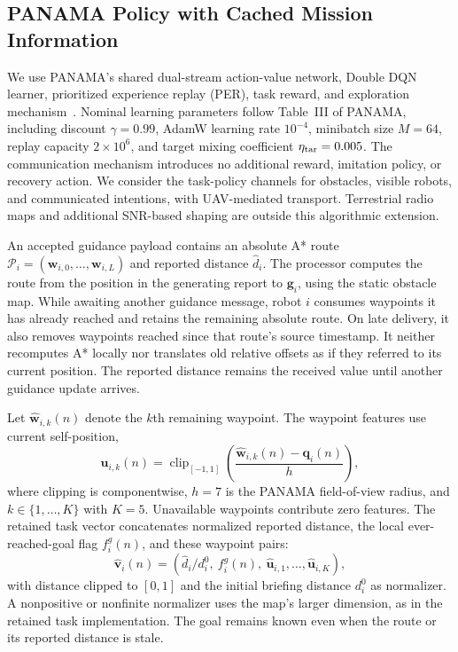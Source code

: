 \begin{panamaaddition}
\subsection{PANAMA Policy with Cached Mission Information}
We use PANAMA's shared dual-stream action-value network, Double DQN learner,
prioritized experience replay (PER), task reward, and exploration mechanism~\cite{panama}.
Nominal learning parameters follow Table~III of PANAMA, including discount
$\gamma=0.99$, AdamW learning rate $10^{-4}$, minibatch size $M=64$, replay
capacity $2\times10^6$, and target mixing coefficient $\eta_{\rm tar}=0.005$.
The communication mechanism introduces no additional reward, imitation policy,
or recovery action. We consider the task-policy channels for obstacles,
visible robots, and communicated intentions, with UAV-mediated transport.
Terrestrial radio maps and additional SNR-based shaping are outside this
algorithmic extension.

An accepted guidance payload contains an absolute A* route
$\mathcal{P}_i=(\mathbf{w}_{i,0},\ldots,\mathbf{w}_{i,L})$ and reported
distance $\widehat{d}_i$. The processor computes the route from the position
in the generating report to $\mathbf{g}_i$, using the static obstacle map.
While awaiting another guidance message, robot $i$ consumes waypoints it has
already reached and retains the remaining absolute route. On late delivery,
it also removes waypoints reached since that route's source timestamp.
It neither recomputes A* locally nor translates old relative offsets as if
they referred to its current position. The reported distance remains the
received value until another guidance update arrives.

Let $\widehat{\mathbf{w}}_{i,k}(n)$ denote the $k$th remaining waypoint.
The waypoint features use current self-position,
\begin{equation}
 \widehat{\mathbf{u}}_{i,k}(n)=
 \operatorname{clip}_{[-1,1]}
 \!\left(\frac{\widehat{\mathbf{w}}_{i,k}(n)-\mathbf{q}_i(n)}{h}\right),
 \label{eq:panama-waypoint}
\end{equation}
where clipping is componentwise, $h=7$ is the PANAMA field-of-view radius,
and $k\in\{1,\ldots,K\}$ with $K=5$. Unavailable waypoints contribute zero
features. The retained task vector concatenates normalized reported distance,
the local ever-reached-goal flag $f_i^g(n)$, and these waypoint pairs:
\begin{equation}
 \widehat{\mathbf{v}}_i(n)=
 (\widehat{d}_i/d_i^0,\ f_i^g(n),\
  \widehat{\mathbf{u}}_{i,1},\ldots,\widehat{\mathbf{u}}_{i,K}),
 \label{eq:panama-vector}
\end{equation}
with distance clipped to $[0,1]$ and the initial briefing distance $d_i^0$
as normalizer. A nonpositive or nonfinite normalizer uses the map's larger
dimension, as in the retained task implementation. The goal remains known
even when the route or its reported distance is stale.


\end{panamaaddition}
